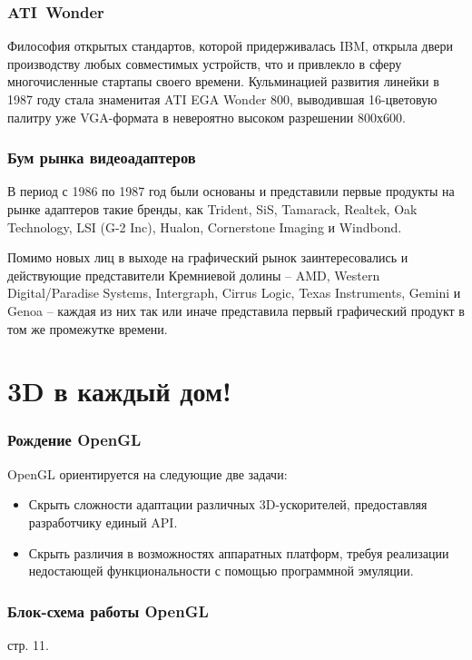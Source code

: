 \documentclass[10pt]{beamer}
\begin{document}
\begin{frame}\frametitle{ATI~Wonder}
{
	Философия открытых стандартов, которой придерживалась IBM, открыла двери производству любых совместимых устройств, что и привлекло в сферу многочисленные стартапы своего времени.
	{
	}
	{
		Кульминацией развития линейки в 1987 году стала знаменитая ATI EGA Wonder 800, выводившая 16-цветовую палитру уже VGA-формата в невероятно высоком разрешении 800х600. 
	}
}\end{frame}

\begin{frame}\frametitle{Бум рынка видеоадаптеров}{
В период с 1986 по 1987 год были основаны и представили первые продукты на рынке адаптеров такие бренды, как Trident, SiS, Tamarack, Realtek, Oak Technology, LSI (G-2 Inc), Hualon, Cornerstone Imaging и Windbond. 

Помимо новых лиц в выходе на графический рынок заинтересовались и действующие представители Кремниевой долины – AMD, Western Digital/Paradise Systems, Intergraph, Cirrus Logic, Texas Instruments, Gemini и Genoa – каждая из них так или иначе представила первый графический продукт в том же промежутке времени.
}\end{frame}

\section{3D в каждый дом!}
\frame{\sectionpage}

\begin{frame}\frametitle{Рождение OpenGL}
{

	
		OpenGL ориентируется на следующие две задачи:
	\begin{itemize}
		\item Скрыть сложности адаптации различных 3D-ускорителей, предоставляя разработчику единый API.
		\item 	Скрыть различия в возможностях аппаратных платформ, требуя реализации недостающей функциональности с помощью программной эмуляции.
	\end{itemize}
}\end{frame}


\begin{frame}\frametitle{Блок-схема работы OpenGL}
{
	
	\vspace{-1.5em}
	
	\footnotesize {} стр. 11.
}\end{frame}
\end{document}

